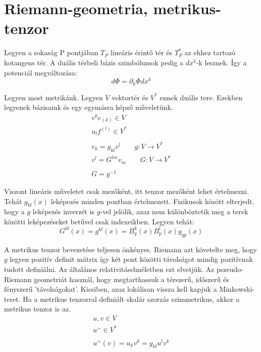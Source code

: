 \documentclass[a4paper,12pt]{article}
\begin{document}
\section{ Riemann-geometria, metrikus-tenzor}
\par Legyen a sokaság P pontjában $T_{P}$ lineáris érintő tér és $T^{*}_{P}$ az ehhez tartozó kotangens tér. A duális térbeli bázis szimbólumok pedig a $dx^{k}$-k lesznek. Így a potenciál megváltozása:
\begin{equation*}
    d\Phi = \partial_k \Phi dx^{k}
\end{equation*}
\par Legyen most metrikánk. Legyen $V$ vektortér és $V^{*}$ ennek duális tere. Ezekben legyenek bázisaink és egy egymásra képző műveletünk. 
\begin{align*}
    v^{k}e_{(k)} \in V \\
    u_{l}f^{(l)} \in V^{*} \\ \\
    v_{k} = g_{kl}v^{l} \quad \quad g : V \rightarrow V^{*} \\
    v^{l} = G^{lm}v_{m} \quad \quad G : V \rightarrow V^{*} \\ \\
    G = g^{-1}
\end{align*}
\par Viszont lineáris műveletet csak mezőként, itt tenzor mezőként lehet értelmezni. Tehát $g_{kl}(x)$ leképezés minden pontban értelmezett. Fizikusok között elterjedt, hogy a $g$ leképezés inverzét is $g$-vel jelölik, azaz nem különböztetik meg a terek közötti leképezéseket betűvel csak indexeikben. Legyen tehát:
\begin{equation*}
    G^{kl}(x) = g^{kl}(x) = B^{k}_{q}(x)B^{l}_{p}(x)g_{qp}(x)
\end{equation*}
\par A metrikus tenzor bevezetése teljesen önkényes. Riemann azt követelte meg, hogy $g$ legyen pozitív definit mátrix így két pont közötti távolságot mindig pozitívnak tudott definiálni. Az általános relativitáselméletben ezt elvetjük. Az pszeudo-Riemann geometriát használ, hogy megtarthassuk a térszerű, időszerű és fényszerű 'távolságokat'. Kicsiben, azaz lokálisan vissza kell kapjuk a Minkowski-teret. Ha a metrikus tenzorral definiált skalár szorzás szimmetrikus, akkor a metrikus tenzor is az.
\begin{gather*}
    u,v \in V \\
    u^{+} \in V^{*} \\ \\
    u^{+}(v) = u_{k}v^{k} = g_{kl}u^{l}v^{k}
\end{gather*}
\end{document}
